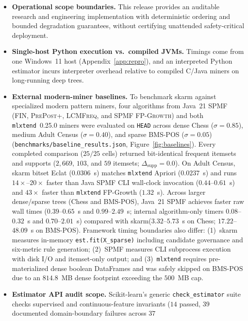 \documentclass[journal,a4paper]{IEEEtran}
\newcommand{\skarm}{skarm\xspace}
\begin{document}
\begin{itemize}
  \item \textbf{Operational scope boundaries.} This release provides an
  auditable research and engineering implementation with deterministic ordering
  and bounded degradation guarantees, without certifying unattended
  safety-critical deployment.
  \item \textbf{Single-host Python execution vs.\ compiled JVMs.} Timings come
  from one Windows~11 host (Appendix~\ref{app:repro}), and an interpreted
  Python estimator incurs interpreter overhead relative to compiled C/Java
  miners on long-running deep trees.
  \item \textbf{External modern-miner baselines.} To benchmark \skarm against
  specialized modern pattern miners, four algorithms from Java~21 SPMF~\cite{fournier2022,kallay2025}
  (\textsc{FIN}, \textsc{PrePost+}, \textsc{LCMFreq}, and SPMF \textsc{FP-Growth})
  and both \texttt{mlxtend}~0.25.0 miners were evaluated on \texttt{HEAD}
  across dense Chess ($\sigma=0.85$), medium Adult Census ($\sigma=0.40$),
  and sparse BMS-POS ($\sigma=0.05$) (\texttt{benchmarks/baseline\_results.json},
  Figure~\ref{fig:baselines}). Every completed comparison ($25/25$ cells)
  returned bit-identical frequent itemsets and supports ($2{,}669$, $103$, and
  $59$ itemsets; $\Delta_{\mathrm{supp}} = 0.0$). On Adult Census, \skarm
  bitset Eclat ($0.0306$~s) matches \texttt{mlxtend} Apriori ($0.0237$~s) and
  runs $14\times$--$20\times$ faster than Java SPMF CLI wall-clock invocation
  ($0.44$--$0.61$~s) and $43\times$ faster than \texttt{mlxtend} FP-Growth
  ($1.32$~s). Across larger dense/sparse trees (Chess and BMS-POS), Java~21
  SPMF achieves faster raw wall times ($0.39$--$0.65$~s and $0.99$--$2.49$~s;
  internal algorithm-only timers $0.08$--$0.32$~s and $0.70$--$2.01$~s)
  compared with \skarm ($3.32$--$5.73$~s on Chess; $17.22$--$48.09$~s on
  BMS-POS). Framework timing boundaries also differ: (1)~\skarm measures
  in-memory \texttt{est.fit(X\_sparse)} including candidate governance and
  six-metric rule generation; (2)~SPMF measures CLI subprocess execution with
  disk I/O and itemset-only output; and (3)~\texttt{mlxtend} requires
  pre-materialized dense boolean DataFrames and was safely skipped on BMS-POS
  due to an $814.8$~MB dense footprint exceeding the $500$~MB cap.
  \item \textbf{Estimator API audit scope.} Scikit-learn's generic
  \texttt{check\_estimator} suite checks supervised and continuous-feature
  invariants ($14$ passed, $39$ documented domain-boundary failures across $37$

\end{itemize}
\end{document}
